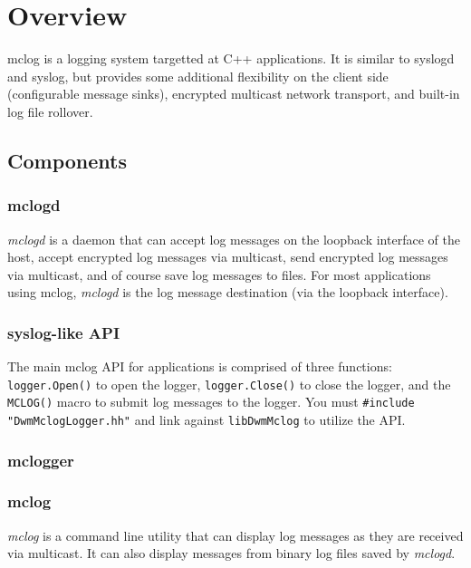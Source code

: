 \chapter{Overview}
mclog is a logging system targetted at C++ applications.  It is similar
to syslogd and syslog, but provides some additional flexibility on the
client side (configurable message sinks), encrypted multicast network
transport, and built-in log file rollover.

\section{Components}
\subsection{mclogd}
\textit{mclogd} is a daemon that can accept log messages on the
loopback interface of the host, accept encrypted log messages via
multicast, send encrypted log messages via multicast, and of course
save log messages to files.  For most applications using mclog,
\textit{mclogd} is the log message destination (via the loopback
interface).

\subsection{syslog-like API}
The main mclog API for applications is comprised of three functions:
\texttt{logger.Open()} to open the logger, \texttt{logger.Close()}
to close the logger, and the \texttt{MCLOG()} macro to submit log
messages to the logger.  You must \texttt{\#include "DwmMclogLogger.hh"}
and link against \texttt{libDwmMclog} to utilize the API.

\subsection{mclogger}

\subsection{mclog}
\textit{mclog} is a command line utility that can display log messages
as they are received via multicast.  It can also display messages from
binary log files saved by \textit{mclogd}.
